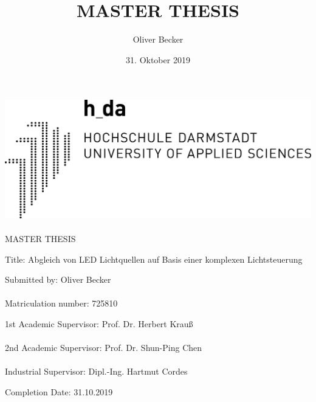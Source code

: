 \documentclass[11pt]{scrartcl}
\title{MASTER THESIS}
\author{Oliver Becker}
\date{31. Oktober 2019} %
\begin{document}
\begin{center}
    \center\includegraphics[width=0.4\linewidth]{images/logo.png}
    \paragraph{}
    \huge MASTER THESIS
\end{center}
\vspace{3cm}\noindent
{\large Title:  Abgleich von LED Lichtquellen auf Basis einer komplexen Lichtsteuerung}
\par\vspace{3cm}\noindent
Submitted by:               Oliver Becker\\
\\
Matriculation number:       725810\\
\par\vspace{2cm}\noindent
1st Academic Supervisor:    Prof. Dr. Herbert Krauß\\
\\
2nd Academic Supervisor:    Prof. Dr. Shun-Ping Chen\\
\\
Industrial Supervisor:      Dipl.-Ing. Hartmut Cordes\\
\par\vspace{2cm}\noindent
Completion Date:            31.10.2019
\clearpage

\tableofcontents
\clearpage

\end{document}
